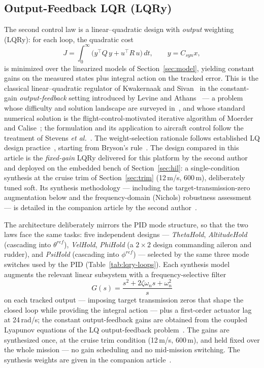 \subsection{Output-Feedback LQR (LQRy)}
\label{sec:lqry}
The second control law is a linear--quadratic design with \emph{output}
weighting (LQRy): for each loop, the quadratic cost
\begin{equation}
J=\int_0^\infty\!\big(y^{\!\top}Q\,y+u^{\!\top}R\,u\big)\,dt,\qquad y=C_{syn}x,
\end{equation}
is minimized over the linearized models of Section~\ref{sec:model},
yielding constant gains on the measured states plus integral action on
the tracked error. This is the classical linear--quadratic regulator
of Kwakernaak and Sivan~\cite{kwakernaak1972linear} in the
constant-gain \emph{output-feedback} setting introduced by Levine and
Athans~\cite{levine1970output} --- a problem whose difficulty and
solution landscape are surveyed in~\cite{syrmos1997static}, and whose
standard numerical solution is the flight-control-motivated iterative
algorithm of Moerder and Calise~\cite{moerder1985convergence}; the
formulation and its application to aircraft control follow the
treatment of Stevens \emph{et al.}~\cite{stevens2016aircraft}. The
weight-selection rationale follows established LQ design
practice~\cite{anderson1990optimal}, starting from Bryson's
rule~\cite{bryson1975applied}. The design compared in this article is
the \emph{fixed-gain} LQRy delivered for this platform by the second
author and deployed on the embedded bench of Section~\ref{sec:hil}: a
single-condition synthesis at the cruise trim of
Section~\ref{sec:trim} (12\,m/s, 600\,m), deliberately tuned soft.
Its synthesis methodology --- including the target-transmission-zero
augmentation below and the frequency-domain (Nichols) robustness
assessment --- is detailed in the companion article by the second
author~\cite{mirko2026companion}.

The architecture deliberately mirrors the PID mode structure, so that
the two laws face the same tasks: five independent designs ---
\emph{ThetaHold}, \emph{AltitudeHold} (cascading into
$\theta^{ref}$), \emph{VelHold}, \emph{PhiHold} (a $2\times2$ design
commanding aileron and rudder), and \emph{PsiHold} (cascading into
$\phi^{ref}$) --- selected by the same three mode switches used by the
PID (Table~\ref{tab:lqry-loops}). Each synthesis model augments the
relevant linear subsystem with a frequency-selective filter
\begin{equation}
G(s)=\frac{s^{2}+2\zeta\omega_{n}s+\omega_{n}^{2}}{s}
\end{equation}
on each tracked output --- imposing target transmission zeros that
shape the closed loop while providing the integral action --- plus a
first-order actuator lag at 24\,rad/s; the constant output-feedback
gains are obtained from the coupled Lyapunov equations of the LQ
output-feedback problem~\cite{levine1970output,moerder1985convergence}.
The gains are synthesized once, at the cruise trim condition
(12\,m/s, 600\,m), and held fixed over the whole mission --- no gain
scheduling and no mid-mission switching. The synthesis weights are
given in the companion article~\cite{mirko2026companion}.

